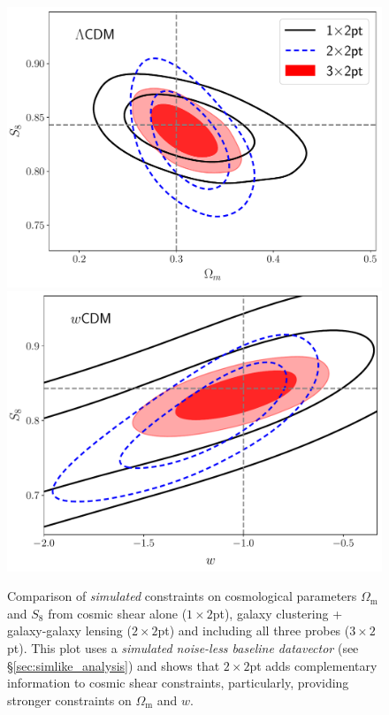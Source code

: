 \documentclass[aps, prd,twocolumn,superscriptaddress,nofootinbib,preprintnumbers]{revtex4-1}
\begin{document}
\begin{figure}
\includegraphics[width=\columnwidth]{figs/simulated_lcdm_compare.pdf}
\includegraphics[width=\columnwidth]{figs/simulated_wcdm_compare.pdf}
\caption[]{Comparison of \textit{simulated} constraints on cosmological parameters $\Omega_{\mathrm{m}}$ and $S_8$ from cosmic shear alone ($1\times2$pt), galaxy clustering + galaxy-galaxy lensing ($2\times2$pt) and including all three probes ($3\times2$pt). This plot uses a \textit{simulated noise-less baseline datavector} (see \S\ref{sec:simlike_analysis}) and shows that $2\times2$pt adds complementary information to cosmic shear constraints, particularly, providing stronger constraints on $\Omega_{\mathrm{m}}$ and $w$.}
\label{fig:all2pt_comp}
\end{figure}
\end{document}

